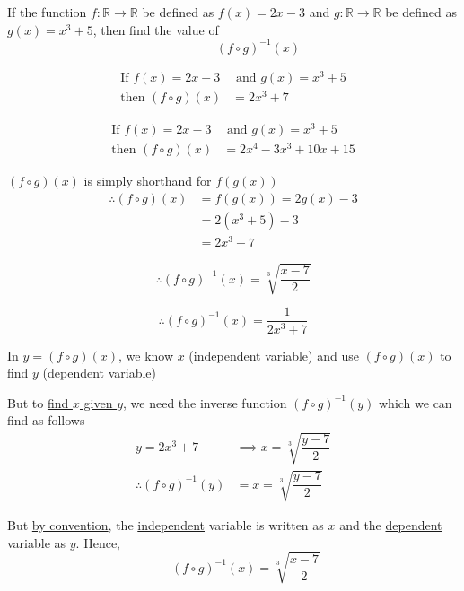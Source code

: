 \documentclass[14pt,fleqn]{extarticle}
\newcommand\R{\mathbb{R}}
\newcommand\fgx{\left(f\circ g \right)\left(x \right)}
\newcommand\ifgy{\left(f\circ g \right)^{-1}\left(y \right)}
\newcommand\ifgx{\left(f\circ g \right)^{-1} \left(x \right)}
\begin{document}
\begin{question}
\statement

If the function $f:\R\to\R$ be defined as $f(x) = 2x-3$ and $g:\R\to\R$ be defined as $g(x) = x^3 + 5$, then find the value of 
\[ \qquad\qquad \ifgx \]	

\begin{step}
  \begin{options} 
     \correct 
       
       \begin{align}
	\text{If } f(x) = 2x - 3 &\text{ and } g(x) = x^3 + 5 \\
	\text{then } \fgx &= 2x^3 + 7 
\end{align}

     \incorrect

       \begin{align}
	\text{If } f(x) = 2x - 3 &\text{ and } g(x) = x^3 + 5 \\
	\text{then } \fgx &= 2x^4 - 3x^3 + 10x + 15  
\end{align}
        
    \end{options} 
     \reason 
     
     $\fgx$ is \underline{simply shorthand} for $f \left(g(x) \right)$
     \begin{align}
     \therefore \fgx &= f \left( g(x) \right) = 2g(x) - 3 \\
     &= 2 \left(x^3 + 5\right) - 3 \\
     &= 2x^3 + 7 
\end{align}
       
\end{step}

\begin{step}
  \begin{options} 
     \correct 
       
       \[ \therefore \ifgx = \sqrt[3]{\dfrac{x-7}{2}} \]
     \incorrect
     
     \[ \therefore \ifgx = \dfrac{1}{2x^3 + 7} \]
        
    \end{options} 
     \reason 

In $ y= \fgx$, we know $x$ (independent variable) and use $\fgx$ to find $y$ (dependent variable)\newline 

But to \underline{find $x$ given $y$}, we need the inverse function $\ifgy$ which we can find as follows 
\begin{align}
y = 2x^3 + 7 &\implies x = \sqrt[3]{\dfrac{y-7}{2}} \\
\therefore \left(f\circ g \right)^{-1}(y) &= x = \sqrt[3]{\dfrac{y-7}{2}}
\end{align}

But \underline{by convention}, the \underline{independent} variable is 
written as $x$ and the \underline{dependent} variable as $y$. Hence, 
\[ \qquad \ifgx = \sqrt[3]{\dfrac{x-7}{2}} \]
       
\end{step}
\end{question}
\end{document}
